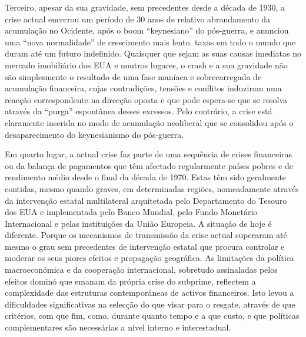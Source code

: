Terceiro, apesar da sua gravidade, sem precedentes desde a década de 1930, a crise actual encerrou um período de {\color{blue}30} anos de relativo abrandamento da acumulação no Ocidente, após o boom “keynesiano” do pós-guerra, e anunciou uma “nova normalidade” de crescimento mais lento. taxas em todo o mundo que duram até um futuro indefinido. Quaisquer que sejam as suas causas imediatas no mercado imobiliário dos EUA e noutros lugares, o crash e a sua gravidade não são simplesmente o resultado de uma fase maníaca e sobrecarregada de acumulação financeira, cujas contradições, tensões e conflitos induziram uma reacção correspondente na direcção oposta e que pode espera-se que se resolva através da “purga” espontânea desses excessos. Pelo contrário, a crise está claramente inserida no modo de acumulação neoliberal que se consolidou após o desaparecimento do keynesianismo do pós-guerra.
 \par 
Em quarto lugar, a actual crise faz parte de uma sequência de crises financeiras ou da balança de pagamentos que têm afectado regularmente países pobres e de rendimento médio desde o final da década de 1970. Estas têm sido geralmente contidas, mesmo quando graves, em determinadas regiões, nomeadamente através da intervenção estatal multilateral arquitetada pelo Departamento do Tesouro dos EUA e implementada pelo Banco Mundial, pelo Fundo Monetário Internacional e pelas instituições da União Europeia. A situação de hoje é diferente. Porque os mecanismos de transmissão da crise actual superaram até mesmo o grau sem precedentes de intervenção estatal que procura controlar e moderar os seus piores efeitos e propagação geográfica. As limitações da política macroeconómica e da cooperação internacional, sobretudo assinaladas pelos efeitos dominó que emanam da própria crise do subprime, reflectem a complexidade das estruturas contemporâneas de activos financeiros. Isto levou a dificuldades significativas na selecção do que visar para o resgate, através de que critérios, com que fim, como, durante quanto tempo e a que custo, e que políticas complementares são necessárias a nível interno e interestadual.
 \par 
